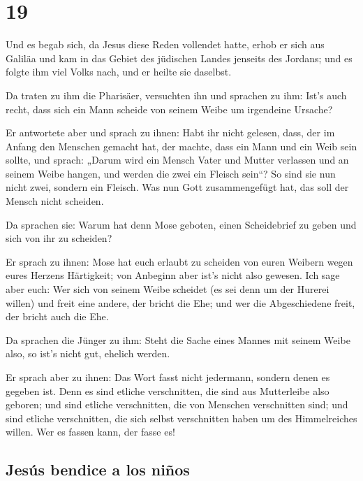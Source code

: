 \hypertarget{section-18}{%
\section{19}\label{section-18}}

 Und es begab sich, da Jesus diese Reden vollendet hatte,
erhob er sich aus Galiläa und kam in das Gebiet des jüdischen Landes
jenseits des Jordans;  und es folgte ihm viel Volks nach,
und er heilte sie daselbst.

 Da traten zu ihm die Pharisäer, versuchten ihn und
sprachen zu ihm: Ist's auch recht, dass sich ein Mann scheide von seinem
Weibe um irgendeine Ursache?

 Er antwortete aber und sprach zu ihnen: Habt ihr nicht
gelesen, dass, der im Anfang den Menschen gemacht hat, der machte, dass
ein Mann und ein Weib sein sollte,  und sprach: „Darum
wird ein Mensch Vater und Mutter verlassen und an seinem Weibe hangen,
und werden die zwei ein Fleisch sein``?  So sind sie nun
nicht zwei, sondern ein Fleisch. Was nun Gott zusammengefügt hat, das
soll der Mensch nicht scheiden.

 Da sprachen sie: Warum hat denn Mose geboten, einen
Scheidebrief zu geben und sich von ihr zu scheiden?

 Er sprach zu ihnen: Mose hat euch erlaubt zu scheiden von
euren Weibern wegen eures Herzens Härtigkeit; von Anbeginn aber ist's
nicht also gewesen.  Ich sage aber euch: Wer sich von
seinem Weibe scheidet (es sei denn um der Hurerei willen) und freit eine
andere, der bricht die Ehe; und wer die Abgeschiedene freit, der bricht
auch die Ehe.

 Da sprachen die Jünger zu ihm: Steht die Sache eines
Mannes mit seinem Weibe also, so ist's nicht gut, ehelich werden.

 Er sprach aber zu ihnen: Das Wort fasst nicht jedermann,
sondern denen es gegeben ist.  Denn es sind etliche
verschnitten, die sind aus Mutterleibe also geboren; und sind etliche
verschnitten, die von Menschen verschnitten sind; und sind etliche
verschnitten, die sich selbst verschnitten haben um des Himmelreiches
willen. Wer es fassen kann, der fasse es!

\hypertarget{jesuxfas-bendice-a-los-niuxf1os}{%
\subsection{Jesús bendice a los
niños}\label{jesuxfas-bendice-a-los-niuxf1os}}

